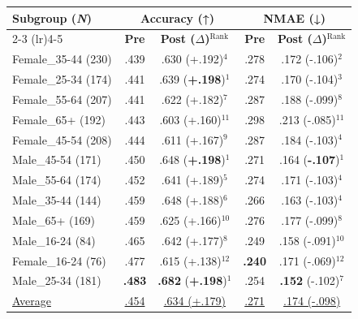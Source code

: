 \begin{tabular}{@{} p{2.7cm} | c c | c c @{}}
\toprule
\multirow{2}{*}{\textbf{Subgroup (\textbf{\textit{N}})}} & \multicolumn{2}{c|}{\textbf{Accuracy (↑)}} & \multicolumn{2}{c}{\textbf{NMAE (↓)}} \\
\cmidrule(lr){2-3} \cmidrule(lr){4-5}
& \textbf{Pre} & \textbf{Post ($\Delta$)}$^{\text{Rank}}$ & \textbf{Pre} & \textbf{Post ($\Delta$)}$^{\text{Rank}}$ \\
\midrule
Female\_35-44 (230) & .439 & .630 (+.192)$^{4}$ & .278 & .172 (-.106)$^{2}$ \\
Female\_25-34 (174) & .441 & .639 (\textbf{+.198})$^{1}$ & .274 & .170 (-.104)$^{3}$ \\
Female\_55-64 (207) & .441 & .622 (+.182)$^{7}$ & .287 & .188 (-.099)$^{8}$ \\
Female\_65+ (192) & .443 & .603 (+.160)$^{11}$ & .298 & .213 (-.085)$^{11}$ \\
Female\_45-54 (208) & .444 & .611 (+.167)$^{9}$ & .287 & .184 (-.103)$^{4}$ \\
Male\_45-54 (171) & .450 & .648 (\textbf{+.198})$^{1}$ & .271 & .164 (\textbf{-.107})$^{1}$ \\
Male\_55-64 (174) & .452 & .641 (+.189)$^{5}$ & .274 & .171 (-.103)$^{4}$ \\
Male\_35-44 (144) & .459 & .648 (+.188)$^{6}$ & .266 & .163 (-.103)$^{4}$ \\
Male\_65+ (169) & .459 & .625 (+.166)$^{10}$ & .276 & .177 (-.099)$^{8}$ \\
Male\_16-24 (84) & .465 & .642 (+.177)$^{8}$ & .249 & .158 (-.091)$^{10}$ \\
Female\_16-24 (76) & .477 & .615 (+.138)$^{12}$ & \textbf{.240} & .171 (-.069)$^{12}$ \\
Male\_25-34 (181) & \textbf{.483} & \textbf{.682} (\textbf{+.198})$^{1}$ & .254 & \textbf{.152} (-.102)$^{7}$ \\
\midrule
\underline{Average} & \underline{.454} & \underline{.634 (+.179)} & \underline{.271} & \underline{.174 (-.098)} \\
\bottomrule
\end{tabular}
